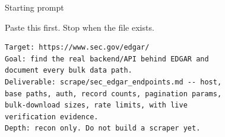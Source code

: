 \documentclass[9pt,aspectratio=169]{beamer}
\begin{document}
\begin{frame}[fragile]{Starting prompt}

  Paste this first. Stop when the file exists.

\begin{lstlisting}[style=shell,columns=fullflexible]
Target: https://www.sec.gov/edgar/
Goal: find the real backend/API behind EDGAR and
document every bulk data path.
Deliverable: scrape/sec_edgar_endpoints.md -- host,
base paths, auth, record counts, pagination params,
bulk-download sizes, rate limits, with live
verification evidence.
Depth: recon only. Do not build a scraper yet.
\end{lstlisting}

\end{frame}
\end{document}
